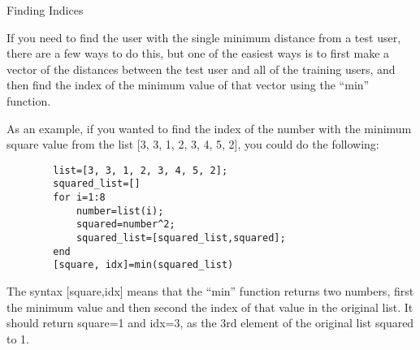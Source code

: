 \documentclass{ximera}
\begin{document}
\begin{exploration}
  \begin{remark}{Finding Indices}

      If you need to find the user with the single minimum distance from a test user, there are a few ways to do this, but one of the easiest ways is to first make a vector of the distances between the test user and all of the training users, and then find the index of the minimum value of that vector using the ``min'' function.

      As an example, if you wanted to find the index of the number with the minimum square value from the list [3, 3, 1, 2, 3, 4, 5, 2], you could do the following:

    \begin{verbatim}
        list=[3, 3, 1, 2, 3, 4, 5, 2];
        squared_list=[]
        for i=1:8
            number=list(i);
            squared=number^2;
            squared_list=[squared_list,squared];
        end
        [square, idx]=min(squared_list)
    \end{verbatim}


      The syntax [square,idx] means that the ``min'' function returns two numbers, first the minimum value and then second the index of that value in the original list. It should return square=1 and idx=3, as the 3rd element of the original list squared to 1.

  \end{remark}

\end{exploration}
\end{document}

